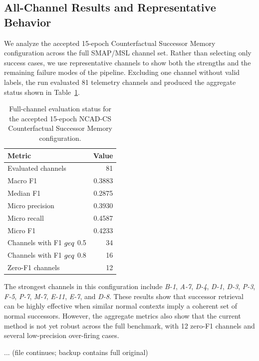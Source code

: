\documentclass[journal]{IEEEtran}
\begin{document}
\subsection{All-Channel Results and Representative Behavior}
\label{subsec:results_analysis}
We analyze the accepted 15-epoch Counterfactual Successor Memory configuration across the full SMAP/MSL channel set. Rather than selecting only success cases, we use representative channels to show both the strengths and the remaining failure modes of the pipeline. Excluding one channel without valid labels, the run evaluated 81 telemetry channels and produced the aggregate status shown in Table~\ref{tab:current_aggregate_status}.

\begin{table}[h!]
\centering
\caption{Full-channel evaluation status for the accepted 15-epoch NCAD-CS Counterfactual Successor Memory configuration.}
\label{tab:current_aggregate_status}
\begin{tabular}{@{}lr@{}}
\toprule
Metric & Value \\
\midrule
Evaluated channels & 81 \\
Macro F1 & 0.3883 \\
Median F1 & 0.2875 \\
Micro precision & 0.3930 \\
Micro recall & 0.4587 \\
Micro F1 & 0.4233 \\
Channels with F1 $\\geq$ 0.5 & 34 \\
Channels with F1 $\\geq$ 0.8 & 16 \\
Zero-F1 channels & 12 \\
\bottomrule
\end{tabular}
\end{table}

The strongest channels in this configuration include \textit{B-1}, \textit{A-7}, \textit{D-4}, \textit{D-1}, \textit{D-3}, \textit{P-3}, \textit{F-5}, \textit{P-7}, \textit{M-7}, \textit{E-11}, \textit{E-7}, and \textit{D-8}. These results show that successor retrieval can be highly effective when similar normal contexts imply a coherent set of normal successors. However, the aggregate metrics also show that the current method is not yet robust across the full benchmark, with 12 zero-F1 channels and several low-precision over-firing cases.

... (file continues; backup contains full original)
\end{document}
